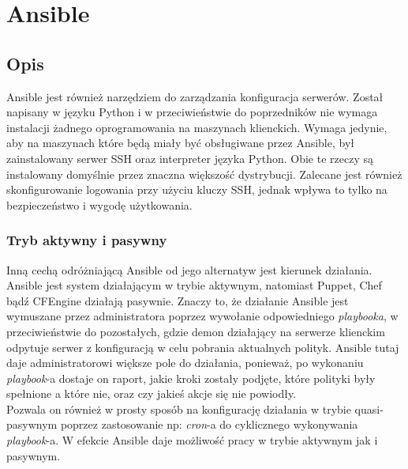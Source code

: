 \section{Ansible}
\label{sec:konfiguracja_ansible}
\subsection{Opis}
Ansible jest również narzędziem do zarządzania konfiguracja serwerów. Został napisany w języku Python i w przeciwieństwie do poprzedników nie wymaga instalacji żadnego oprogramowania na maszynach klienckich.
Wymaga jedynie, aby na maszynach które będą miały być obsługiwane przez Ansible, był zainstalowany serwer SSH oraz interpreter języka Python. Obie te rzeczy są instalowany domyślnie przez znaczna większość dystrybucji.
Zalecane jest również skonfigurowanie logowania przy użyciu kluczy SSH, jednak wpływa to tylko na bezpieczeństwo i wygodę użytkowania.\\
\subsubsection{Tryb aktywny i pasywny}
Inną cechą odróżniającą Ansible od jego alternatyw jest kierunek działania.
Ansible jest system działającym w trybie aktywnym, natomiast Puppet, Chef bądź CFEngine działają pasywnie.
Znaczy to, że działanie Ansible jest wymuszane przez administratora poprzez wywołanie odpowiedniego \textit{playbooka}, w przeciwieństwie do pozostałych, gdzie demon działający na serwerze klienckim odpytuje serwer z konfiguracją w celu pobrania aktualnych polityk.
Ansible tutaj daje administratorowi większe pole do działania, ponieważ, po wykonaniu \textit{playbook}-a dostaje on raport, jakie kroki zostały podjęte, które polityki były spełnione a które nie, oraz czy jakieś akcje się nie powiodły.\\
Pozwala on również w prosty sposób na konfigurację działania w trybie quasi-pasywnym poprzez zastosowanie np: \textit{cron}-a do cyklicznego wykonywania \textit{playbook}-a.
W efekcie Ansible daje możliwość pracy w trybie aktywnym jak i pasywnym.
